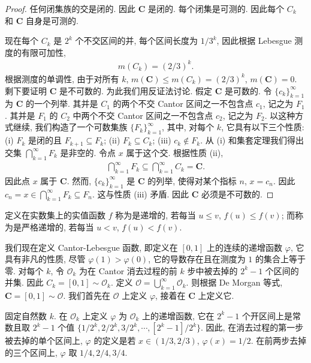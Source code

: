 \documentclass[../../main.tex]{subfiles}
\begin{document}
\begin{proof}
任何闭集族的交是闭的. 因此 $\mathbf{C}$ 是闭的. 每个闭集是可测的. 因此每个 $C_{k}$ 和 $\mathbf{C}$ 自身是可测的.

现在每个 $C_{k}$ 是 $2^{k}$ 个不交区间的并, 每个区间长度为 $1/3^{k}$, 因此根据 Lebesgue 测度的有限可加性,
\begin{align*}
m(C_{k})=(2/3)^{k}.
\end{align*}
根据测度的单调性, 由于对所有 $k$, $m(\mathbf{C})\leqslant m(C_{k})=(2/3)^{k}$, $m(\mathbf{C})=0$. 剩下要证明 $\mathbf{C}$ 是不可数的. 为此我们用反证法讨论. 假定 $\mathbf{C}$ 是可数的. 令 $\{c_{k}\}_{k=1}^{\infty}$ 为 $\mathbf{C}$ 的一个列举. 其并是 $C_{1}$ 的两个不交 Cantor 区间之一不包含点 $c_{1}$, 记之为 $F_{1}$. 其并是 $F_{1}$ 的 $C_{2}$ 中两个不交 Cantor 区间之一不包含点 $c_{2}$, 记之为 $F_{2}$. 以这种方式继续, 我们构造了一个可数集族 $\{F_{k}\}_{k=1}^{\infty}$, 其中, 对每个 $k$, 它具有以下三个性质: (i) $F_{k}$ 是闭的且 $F_{k+1}\subseteq F_{k}$; (ii) $F_{k}\subseteq C_{k}$; (iii) $c_{k}\notin F_{k}$. 从 (i) 和集套定理我们得出交集 $\bigcap_{k=1}^{\infty}F_{k}$ 是非空的. 令点 $x$ 属于这个交. 根据性质 (ii),
\begin{align*}
\bigcap_{k=1}^{\infty}F_{k}\subseteq\bigcap_{k=1}^{\infty}C_{k}=\mathbf{C}.
\end{align*}
因此点 $x$ 属于 $\mathbf{C}$. 然而, $\{c_{k}\}_{k=1}^{\infty}$ 是 $\mathbf{C}$ 的列举, 使得对某个指标 $n$, $x=c_{n}$. 因此 $c_{n}=x\in\bigcap_{k=1}^{\infty}F_{k}\subseteq F_{n}$. 这与性质 (iii) 矛盾. 因此 $\mathbf{C}$ 必须是不可数的.
\end{proof}

定义在实数集上的实值函数 $f$ 称为是递增的, 若每当 $u\leqslant v$, $f(u)\leqslant f(v)$; 而称为是严格递增的, 若每当 $u<v$, $f(u)<f(v)$.

我们现在定义 Cantor-Lebesgue 函数, 即定义在 $[0,1]$ 上的连续的递增函数 $\varphi$, 它具有非凡的性质, 尽管 $\varphi(1)>\varphi(0)$, 它的导数存在且在测度为 $1$ 的集合上等于零. 对每个 $k$, 令 $\mathcal{O}_{k}$ 为在 Cantor 消去过程的前 $k$ 步中被去掉的 $2^{k}-1$ 个区间的并集. 因此 $C_{k}=[0,1]\sim\mathcal{O}_{k}$. 定义 $\mathcal{O}=\bigcup_{k=1}^{\infty}\mathcal{O}_{k}$. 则根据 De Morgan 等式, $\mathbf{C}=[0,1]\sim\mathcal{O}$. 我们首先在 $\mathcal{O}$ 上定义 $\varphi$, 接着在 $\mathbf{C}$ 上定义它.

固定自然数 $k$. 在 $\mathcal{O}_{k}$ 上定义 $\varphi$ 为 $\mathcal{O}_{k}$ 上的递增函数, 它在 $2^{k}-1$ 个开区间上是常数且取 $2^{k}-1$ 个值 $\{1/2^{k},2/2^{k},3/2^{k},\cdots,[2^{k}-1]/2^{k}\}$. 因此, 在消去过程的第一步被去掉的单个区间上, $\varphi$ 的定义是若 $x\in(1/3,2/3)$, $\varphi(x)=1/2$. 在前两步去掉的三个区间上, $\varphi$ 取 $1/4,2/4,3/4$.
\end{document}
